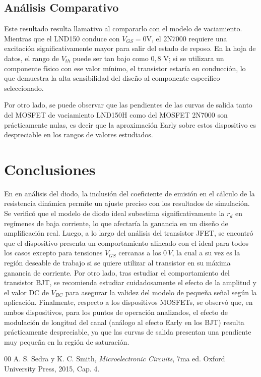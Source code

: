 \documentclass[conference]{IEEEtran} \IEEEoverridecommandlockouts
\begin{document}
\subsection{Análisis Comparativo}
Este resultado resulta llamativo al compararlo con el modelo de vaciamiento. Mientras que el LND150 conduce con $V_{GS}=0$V, el 2N7000 requiere una excitación significativamente mayor para salir del estado de reposo. En la hoja de datos, el rango de $V_{th}$ puede ser tan bajo como $0,8$ V; si se utilizara un componente físico con ese valor mínimo, el transistor estaría en conducción, lo que demuestra la alta sensibilidad del diseño al componente específico seleccionado.
\par Por otro lado, se puede observar que las pendientes de las curvas de salida tanto del MOSFET de vaciamiento LND150H como del MOSFET 2N7000 son prácticamente nulas, es decir que la aproximación Early sobre estos dispositivo es despreciable en los rangos de valores estudiados.

\section{Conclusiones} 
En en análisis del diodo, la inclusión del coeficiente de emisión en el cálculo de la resistencia dinámica permite un ajuste preciso con los resultados de simulación. Se verificó que el modelo de diodo ideal subestima significativamente la $r_d$ en regímenes de baja corriente, lo que afectaría la ganancia en un diseño de amplificación real.
Luego, a lo largo del análisis del transistor JFET, se encontró que el dispositivo presenta un comportamiento alineado con el ideal para todos los casos excepto para tensiones $V_{GS}$ cercanas a los $0\,V$, la cual a su vez es la región deseable de trabajo si se quiere utilizar al transistor en su máxima ganancia de corriente.
Por otro lado, tras estudiar el comportamiento del transistor BJT, se recomienda estudiar cuidadosamente el efecto de la amplitud y el valor DC de $V_{BC}$ para asegurar la validez del modelo de pequeña señal según la aplicación.
Finalmente, respecto a los dispositivos MOSFETs, se observó que, en ambos dispositivos, para los puntos de operación analizados, el efecto de modulación de longitud del canal (análogo al efecto Early en los BJT) resulta prácticamente despreciable, ya que las curvas de salida presentan una pendiente muy pequeña en la región de saturación.




        

\begin{thebibliography}{00}  A. S. Sedra y K. C. Smith, \textit{Microelectronic Circuits}, 7ma ed. Oxford University 
            Press, 2015, Cap. 4. \end{thebibliography} 
\end{document}
